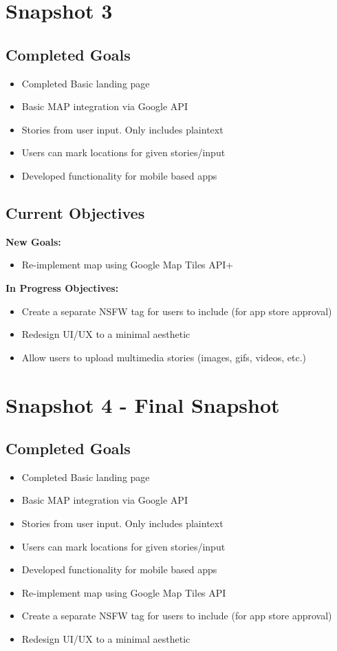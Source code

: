 \documentclass{article}
\begin{document}
\section{Snapshot 3}
\subsection{Completed Goals}
    \begin{itemize}
        \item Completed Basic landing page 
        \item Basic MAP integration via Google API
        \item Stories from user input. Only includes plaintext 
        \item Users can mark locations for given stories/input
        \item Developed functionality for mobile based apps
    \end{itemize}
    
\subsection{Current Objectives}
\textbf{New Goals:}
    \begin{itemize}
        \item Re-implement map using Google Map Tiles API+
        \end{itemize}
\textbf{In Progress Objectives:}
    \begin{itemize}
        \item Create a separate NSFW tag for users to include (for app store approval)
        \item Redesign UI/UX to a minimal aesthetic
        \item Allow users to upload multimedia stories (images, gifs, videos, etc.)
    \end{itemize}

\section{Snapshot 4 - Final Snapshot}
\subsection{Completed Goals}
    \begin{itemize}
        \item Completed Basic landing page 
        \item Basic MAP integration via Google API
        \item Stories from user input. Only includes plaintext 
        \item Users can mark locations for given stories/input
        \item Developed functionality for mobile based apps
        \item Re-implement map using Google Map Tiles API
        \item Create a separate NSFW tag for users to include (for app store approval)
        \item Redesign UI/UX to a minimal aesthetic
    \end{itemize}
    
\end{document}
